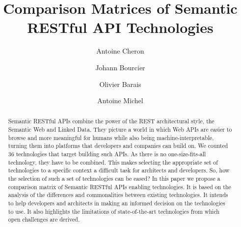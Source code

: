 \documentclass[runningheads]{llncs}
\begin{document}
%
\title{Comparison Matrices of Semantic RESTful API Technologies}
%
%
\author{Antoine Cheron \and
Johann Bourcier \and
Olivier Barais \and
Antoine Michel}
%
%
%
\maketitle              %

\begin{abstract}
	
	\vspace*{-0.5cm}
	
Semantic RESTful APIs combine the power of the REST architectural style, the Semantic Web and Linked Data. They picture a world in which Web APIs are easier to browse and more meaningful for humans while also being machine-interpretable, turning them into platforms that developers and companies can build on. We counted 36 technologies that target building such APIs. As there is no one-size-fits-all technology, they have to be combined. This makes selecting the appropriate set of technologies to a specific context a difficult task for architects and developers. So, how the selection of such a set of technologies can be eased?
In this paper we propose a comparison matrix of Semantic RESTful APIs enabling technologies. It is based on the analysis of the differences and commonalities between existing technologies. It intends to help developers and architects in making an informed decision on the technologies to use. It also highlights the limitations of state-of-the-art technologies from which open challenges are derived.

\vspace*{-0.2cm}
\end{abstract}
%







%
%
%
% 
% 
%



\end{document}
